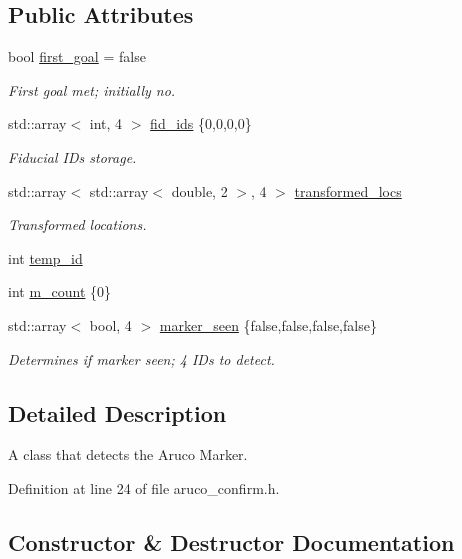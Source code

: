 \subsection*{Public Attributes}
\begin{DoxyCompactItemize}
\item 
bool \hyperlink{class_aruco_node_a323a2a97fc30a4e6daf59d9577485569}{first\+\_\+goal} = false
\begin{DoxyCompactList}\small\item\em First goal met; initially no. \end{DoxyCompactList}\item 
std\+::array$<$ int, 4 $>$ \hyperlink{class_aruco_node_aa64bc8aad47d7569e315f5045ecaa7ac}{fid\+\_\+ids} \{0,0,0,0\}
\begin{DoxyCompactList}\small\item\em Fiducial I\+Ds storage. \end{DoxyCompactList}\item 
std\+::array$<$ std\+::array$<$ double, 2 $>$, 4 $>$ \hyperlink{class_aruco_node_ab410bc0b655071ee67e7ba63b4edf256}{transformed\+\_\+locs}
\begin{DoxyCompactList}\small\item\em Transformed locations. \end{DoxyCompactList}\item 
int \hyperlink{class_aruco_node_ac9561321e855855ccc8f643cc139a638}{temp\+\_\+id}
\item 
int \hyperlink{class_aruco_node_a454cdb8d15fa07e7913887a1b2029600}{m\+\_\+count} \{0\}
\item 
std\+::array$<$ bool, 4 $>$ \hyperlink{class_aruco_node_a2e41167c119527f9fbeb937838fc8909}{marker\+\_\+seen} \{false,false,false,false\}
\begin{DoxyCompactList}\small\item\em Determines if marker seen; 4 I\+Ds to detect. \end{DoxyCompactList}\end{DoxyCompactItemize}


\subsection{Detailed Description}
A class that detects the Aruco Marker. 

Definition at line 24 of file aruco\+\_\+confirm.\+h.



\subsection{Constructor \& Destructor Documentation}
\mbox{\label{class_aruco_node_af8a93117bb0cf5f43bc10d3f0c2e9777}} 
